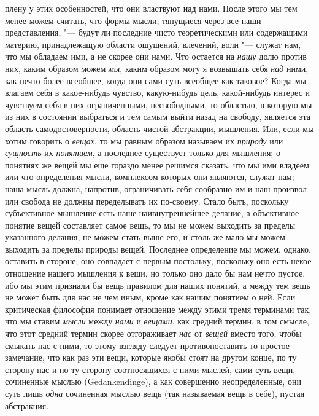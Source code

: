 плену у этих особенностей, что они властвуют над нами. После этого мы тем
менее можем считать, что формы мысли, тянущиеся через все наши
представления, "--- будут ли последние чисто теоретическими или содержащими
материю, принадлежащую области ощущений, влечений, воли "--- служат нам, что
мы обладаем ими, а не скорее они нами. Что остается на
{\em нашу} долю против них, каким образом можем
{\em мы}, каким образом могу я возвышать себя
{\em над} ними, как нечто более всеобщее, когда они
сами суть всеобщее как таковое? Когда мы влагаем себя в какое-нибудь
чувство, какую-нибудь цель, какой-нибудь интерес и чувствуем себя в них
ограниченными, несвободными, то областью, в которую мы из них в состоянии
выбраться и тем самым выйти назад на свободу, является эта область
самодостоверности, область чистой абстракции, мышления. Или, если мы хотим
говорить о {\em вещах}, то мы равным образом называем
их {\em природу} или {\em сущность}
их {\em понятием}, а последнее существует только для
мышления; о понятиях же вещей мы еще гораздо менее решимся сказать, что мы
ими владеем или что определения мысли, комплексом которых они являются,
служат нам; наша мысль должна, напротив, ограничивать себя сообразно им и
наш произвол или свобода не должны переделывать их по-своему. Стало быть,
поскольку субъективное мышление есть наше наивнутреннейшее делание, а
объективное понятие вещей составляет самое вещь, то мы не можем выходить за
пределы указанного делания, не можем стать выше его, и столь же мало мы
можем выходить за пределы природы вещей. Последнее определение мы можем,
однако, оставить в стороне; оно совпадает с первым постольку, поскольку оно
есть некое отношение нашего мышления к вещи, но только оно дало бы нам
нечто пустое, ибо мы этим признали бы вещь правилом для наших понятий, а
между тем вещь не может быть для нас не чем иным, кроме как нашим понятием
о ней. Если критическая философия понимает отношение между этими тремя
терминами так, что мы ставим {\em мысли} между {\em нами} и {\em вещами}, как
средний термин, в том смысле, что этот средний термин скорее отгораживает
{\em нас} от {\em вещей} вместо
того, чтобы смыкать нас с ними, то этому взгляду следует противопоставить
то простое замечание, что как раз эти вещи, которые якобы стоят на другом
конце, по ту сторону нас и по ту сторону соотносящихся с ними мыслей, сами
суть вещи, сочиненные мыслью (Gedankendinge), а как совершенно
неопределенные, они суть лишь {\em одна} сочиненная
мыслью вещь (так называемая вещь в себе), пустая абстракция.


